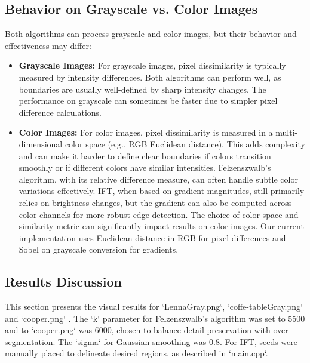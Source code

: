 \documentclass{sbc2023}
\begin{document}
\subsection{Behavior on Grayscale vs. Color Images}
Both algorithms can process grayscale and color images, but their behavior and effectiveness may differ:

\begin{itemize}
    \item \textbf{Grayscale Images:} For grayscale images, pixel dissimilarity is typically measured by intensity differences. Both algorithms can perform well, as boundaries are usually well-defined by sharp intensity changes. The performance on grayscale can sometimes be faster due to simpler pixel difference calculations.
    \item \textbf{Color Images:} For color images, pixel dissimilarity is measured in a multi-dimensional color space (e.g., RGB Euclidean distance). This adds complexity and can make it harder to define clear boundaries if colors transition smoothly or if different colors have similar intensities. Felzenszwalb's algorithm, with its relative difference measure, can often handle subtle color variations effectively. IFT, when based on gradient magnitudes, still primarily relies on brightness changes, but the gradient can also be computed across color channels for more robust edge detection. The choice of color space and similarity metric can significantly impact results on color images. Our current implementation uses Euclidean distance in RGB for pixel differences and Sobel on grayscale conversion for gradients.
\end{itemize}

\subsection{Results Discussion}

This section presents the visual results for `LennaGray.png`, `coffe-tableGray.png` and `cooper.png` . The `k` parameter for Felzenszwalb's algorithm was set to 5500 and to `cooper.png` was 6000, chosen to balance detail preservation with over-segmentation. The `sigma` for Gaussian smoothing was 0.8. For IFT, seeds were manually placed to delineate desired regions, as described in `main.cpp`.
\end{document}

